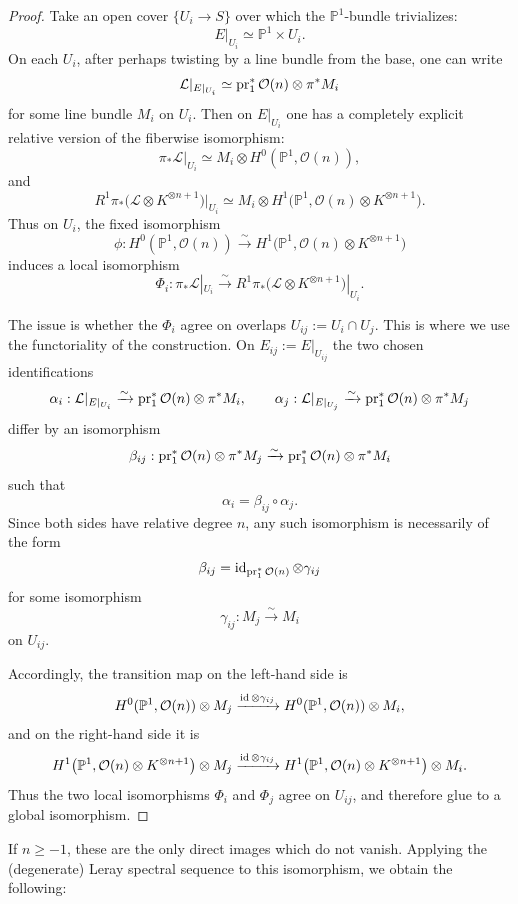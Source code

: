 \documentclass[12pt]{article}
\begin{document}
\begin{proof}
Take an open cover \(\{U_i\to S\}\) over which the \(\mathbb P^1\)-bundle trivializes:
\[
E|_{U_i}\simeq \mathbb P^1\times U_i.
\]
On each \(U_i\), after perhaps twisting by a line bundle from the base, one can write
\[
\mathcal L|_{E|_{U_i}}
\simeq
\operatorname{pr}_1^*\mathcal O(n)\otimes \pi^*M_i
\]
for some line bundle \(M_i\) on \(U_i\). Then on \(E|_{U_i}\) one has a completely explicit relative version of the fiberwise isomorphism:
\[
\pi_*\mathcal L|_{U_i}
\simeq
M_i\otimes H^0(\mathbb P^1,\mathcal O(n)),
\]
and
\[
R^1\pi_*\bigl(\mathcal L\otimes K^{\otimes n+1}\bigr)|_{U_i}
\simeq
M_i\otimes H^1\bigl(\mathbb P^1,\mathcal O(n)\otimes K^{\otimes n+1}\bigr).
\]
Thus on \(U_i\), the fixed isomorphism
\[
\phi:
H^0(\mathbb P^1,\mathcal O(n))
\xrightarrow{\sim}
H^1\bigl(\mathbb P^1,\mathcal O(n)\otimes K^{\otimes n+1}\bigr)
\]
induces a local isomorphism
\[
\Phi_i:
\pi_*\mathcal L|_{U_i}
\xrightarrow{\sim}
R^1\pi_*\bigl(\mathcal L\otimes K^{\otimes n+1}\bigr)|_{U_i}.
\]

The issue is whether the \(\Phi_i\) agree on overlaps \(U_{ij}:=U_i\cap U_j\). This is where we use the functoriality of the construction. On $E_{ij}:=E|_{U_{ij}}$
the two chosen identifications
\[
\alpha_i:\mathcal L|_{E|_{U_i}}
\xrightarrow{\sim}
\operatorname{pr}_1^*\mathcal O(n)\otimes \pi^*M_i,
\qquad
\alpha_j:\mathcal L|_{E|_{U_j}}
\xrightarrow{\sim}
\operatorname{pr}_1^*\mathcal O(n)\otimes \pi^*M_j
\]
differ by an isomorphism
\[
\beta_{ij}:
\operatorname{pr}_1^*\mathcal O(n)\otimes \pi^*M_j
\xrightarrow{\sim}
\operatorname{pr}_1^*\mathcal O(n)\otimes \pi^*M_i
\]
such that
\[
\alpha_i=\beta_{ij}\circ \alpha_j.
\]
Since both sides have relative degree \(n\), any such isomorphism is necessarily of the form
\[
\beta_{ij}=\operatorname{id}_{\operatorname{pr}_1^*\mathcal O(n)}\otimes \gamma_{ij}
\]
for some isomorphism
\[
\gamma_{ij}:M_j\xrightarrow{\sim} M_i
\]
on \(U_{ij}\).

Accordingly, the transition map on the left-hand side is
\[
H^0(\mathbb P^1,\mathcal O(n))\otimes M_j
\xrightarrow{\operatorname{id}\otimes \gamma_{ij}}
H^0(\mathbb P^1,\mathcal O(n))\otimes M_i,
\]
and on the right-hand side it is
\[
H^1\bigl(\mathbb P^1,\mathcal O(n)\otimes K^{\otimes n+1}\bigr)\otimes M_j
\xrightarrow{\operatorname{id}\otimes \gamma_{ij}}
H^1\bigl(\mathbb P^1,\mathcal O(n)\otimes K^{\otimes n+1}\bigr)\otimes M_i.
\]
Thus the two local isomorphisms \(\Phi_i\) and \(\Phi_j\) agree on \(U_{ij}\), and therefore glue to a global isomorphism.
\end{proof}

If \(n\ge -1\), these are the only direct images which do not vanish.
Applying the (degenerate) Leray spectral sequence to this isomorphism, we obtain the following:
\end{document}
